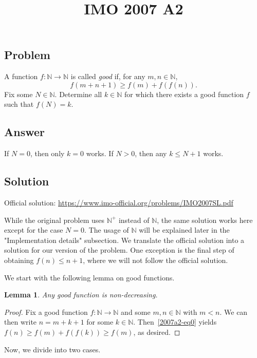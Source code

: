 \documentclass{article}
\title{IMO 2007 A2}
\author{}
\date{}
\newcommand{\N}{\mathbb{N}}
\newtheorem{lemma}{Lemma}
\begin{document}
\maketitle



\subsection*{Problem}

A function $f : \N \to \N$ is called \textit{good} if, for any $m, n \in \N$,
\[ f(m + n + 1) \geq f(m) + f(f(n)). \tag{*}\label{2007a2-eq0} \]
Fix some $N \in \N$.
Determine all $k \in \N$ for which there exists a good function $f$ such that $f(N) = k$.



\subsection*{Answer}

If $N = 0$, then only $k = 0$ works.
If $N > 0$, then any $k \leq N + 1$ works.



\subsection*{Solution}

Official solution: \url{https://www.imo-official.org/problems/IMO2007SL.pdf}

While the original problem uses $\N^+$ instead of $\N$, the same solution works here except for the case $N = 0$.
The usage of $\N$ will be explained later in the "Implementation details" subsection.
We translate the official solution into a solution for our version of the problem.
One exception is the final step of obtaining $f(n) \leq n + 1$, where we will not follow the official solution.

We start with the following lemma on good functions.

\begin{lemma}\label{2007a2-1}
Any good function is non-decreasing.
\end{lemma}
\begin{proof}
Fix a good function $f : \N \to \N$ and some $m, n \in \N$ with $m < n$.
We can then write $n = m + k + 1$ for some $k \in \N$.
Then~\eqref{2007a2-eq0} yields $f(n) \geq f(m) + f(f(k)) \geq f(m)$, as desired.
\end{proof}

Now, we divide into two cases.
\end{document}
